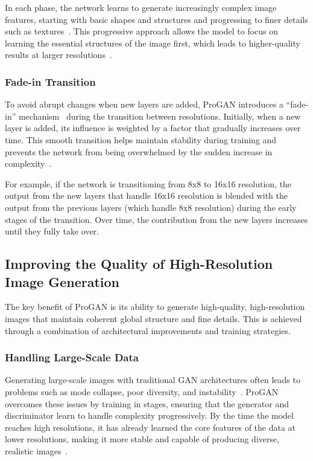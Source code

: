 In each phase, the network learns to generate increasingly complex image features, starting with basic shapes and structures and progressing to finer details such as textures~\cite{karras2017progressive}. This progressive approach allows the model to focus on learning the essential structures of the image first, which leads to higher-quality results at larger resolutions~\cite{zhang2019progressive}.

\subsubsection{Fade-in Transition}
To avoid abrupt changes when new layers are added, ProGAN introduces a ``fade-in'' mechanism~\cite{zheng2022exploratory} during the transition between resolutions. Initially, when a new layer is added, its influence is weighted by a factor that gradually increases over time. This smooth transition helps maintain stability during training and prevents the network from being overwhelmed by the sudden increase in complexity~\cite{karras2017progressive}.

For example, if the network is transitioning from 8x8 to 16x16 resolution, the output from the new layers that handle 16x16 resolution is blended with the output from the previous layers (which handle 8x8 resolution) during the early stages of the transition. Over time, the contribution from the new layers increases until they fully take over.

\subsection{Improving the Quality of High-Resolution Image Generation}
The key benefit of ProGAN is its ability to generate high-quality, high-resolution images that maintain coherent global structure and fine details. This is achieved through a combination of architectural improvements and training strategies.

\subsubsection{Handling Large-Scale Data}
Generating large-scale images with traditional GAN architectures often leads to problems such as mode collapse, poor diversity, and instability~\cite{pathak2018efficient, kang2023scaling}. ProGAN overcomes these issues by training in stages, ensuring that the generator and discriminator learn to handle complexity progressively. By the time the model reaches high resolutions, it has already learned the core features of the data at lower resolutions, making it more stable and capable of producing diverse, realistic images~\cite{kang2023scaling}.

